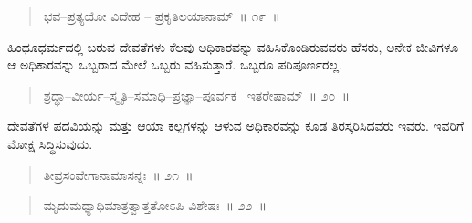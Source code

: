 \vspace{-0.1cm}

\begin{verse}
ಭವ–ಪ್ರತ್ಯಯೋ ವಿದೇಹ – ಪ್ರಕೃತಿಲಯಾನಾಮ್​~॥ ೧೯~॥
\end{verse}

\vspace{-0.4cm}


\vspace{0.2cm}

ಹಿಂಧೂಧರ್ಮದಲ್ಲಿ ಬರುವ ದೇವತೆಗಳು ಕೆಲವು ಅಧಿಕಾರವನ್ನು ವಹಿಸಿಕೊಂಡಿರುವ\break ವರು ಹೆಸರು, ಅನೇಕ ಜೀವಿಗಳೂ ಆ ಅಧಿಕಾರವನ್ನು ಒಬ್ಬರಾದ ಮೇಲೆ ಒಬ್ಬರು ವಹಿಸುತ್ತಾರೆ. ಒಬ್ಬರೂ ಪರಿಪೂರ್ಣರಲ್ಲ. 

\newpage


\begin{verse}
ಶ್ರದ್ಧಾ–ವೀರ್ಯ–ಸ್ಮೃತಿ–ಸಮಾಧಿ–ಪ್ರಜ್ಞಾ–ಪೂರ್ವಕ ~ಇತರೇಷಾಮ್​~॥ ೨೦~॥
\end{verse}

\vspace{-0.4cm}


\vspace{0.1cm}

ದೇವತೆಗಳ ಪದವಿಯನ್ನು ಮತ್ತು ಆಯಾ ಕಲ್ಪಗಳನ್ನು ಆಳುವ ಅಧಿಕಾರವನ್ನು ಕೂಡ ತಿರಸ್ಕರಿಸಿದವರು ಇವರು. ಇವರಿಗೆ ಮೋಕ್ಷ ಸಿದ್ಧಿಸುವುದು. 

\vspace{-0.1cm}

\begin{verse}
ತೀವ್ರಸಂವೇಗಾನಾಮಾಸನ್ನಃ~॥ ೨೧~॥
\end{verse}

\vspace{-0.4cm}


\vspace{-0.1cm}

\begin{verse}
ಮೃದುಮಧ್ಯಾಧಿಮಾತ್ರತ್ವಾತ್ತತೋಽಪಿ ವಿಶೇಷಃ~॥ ೨೨~॥
\end{verse}

\vspace{-0.4cm}


\vspace{-0.1cm}

